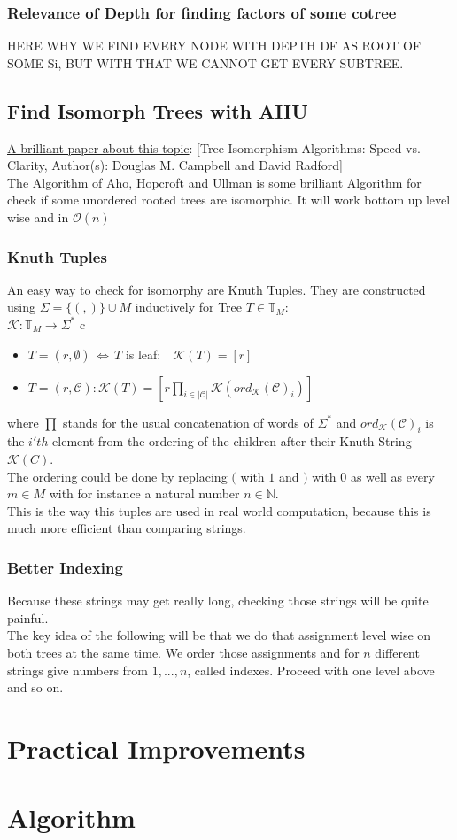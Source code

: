 \documentclass[a4paper,12pt]{article}
\theoremstyle{definition}
\begin{document}
		\subsubsection{Relevance of Depth for finding factors of some cotree}
		HERE WHY WE FIND EVERY NODE WITH DEPTH DF AS ROOT OF SOME Si, BUT WITH THAT WE CANNOT GET EVERY SUBTREE.
			
	\subsection{Find Isomorph Trees with AHU}
	\hyperlink{www.jstor.org/stable/pdf/2690833.pdf}{A brilliant paper about this topic}: [Tree Isomorphism Algorithms: Speed vs. Clarity,\quad
	Author(s): Douglas M. Campbell and David Radford]\\
	The Algorithm of Aho, Hopcroft and Ullman is some brilliant Algorithm for check if some unordered rooted trees are isomorphic. It will work bottom up level wise and in $\mathcal{O}(n)$
	\subsubsection{Knuth Tuples}
	An easy way to check for isomorphy are Knuth Tuples. They are constructed using $\Sigma =\{(,)\}\cup M$ inductively for Tree $T\in \mathds{T}_M$:\\
	$\mathcal{K}: \mathds{T}_M \longrightarrow \Sigma^*$
	c\begin{itemize}
		\item $T=(r,\emptyset)\,\Leftrightarrow\, T$  is leaf:$\quad \mathcal{K} (T) =[r]$
		\item $T=(r,\mathcal{C}): \mathcal{K}(T)=[r \prod_{i\in |\mathcal{C}|} \mathcal K(ord_{\mathcal{K}}(\mathcal{C})_i)]$
	\end{itemize}
	where $\prod$ stands for the usual concatenation of words of $\Sigma^*$ and $ord_{\mathcal{K}}(\mathcal{C})_i$ is the $i'th$ element from the ordering of the children after their Knuth String $\mathcal{K}(C)$.\\
	The ordering could be done by replacing $($ with $1$ and $)$ with $0$ as well as every $m\in M$ with for instance a natural number $n\in \mathds{N}$.\\
	This is the way this tuples are used in real world computation, because this is much more efficient than comparing strings.
	\subsubsection{Better Indexing}
	Because these strings may get really long, checking those strings will be quite painful.\\
	The key idea of the following will be that we do that assignment level wise on both trees at the same time. We order those assignments and for $n$ different strings give numbers from $1,...,n$, called indexes. Proceed with one level above and so on.
	\section{Practical Improvements}
	\section{Algorithm}
		
\end{document}

